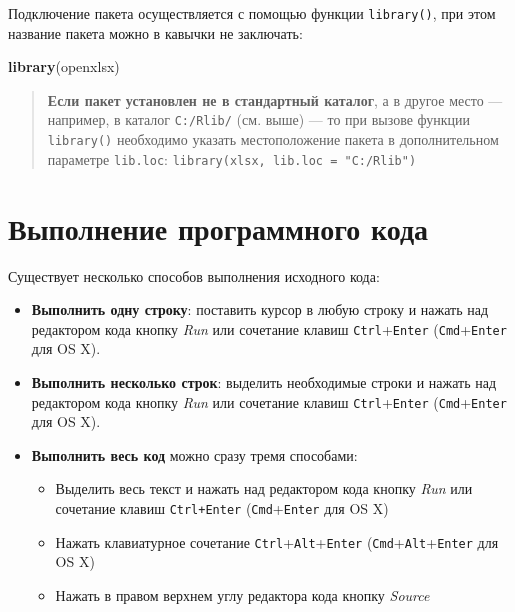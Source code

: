 \documentclass[]{book}
\newenvironment{Shaded}{\begin{snugshade}}{\end{snugshade}}
\newcommand{\KeywordTok}[1]{\textcolor[rgb]{0.13,0.29,0.53}{\textbf{#1}}}
\newcommand{\NormalTok}[1]{#1}
\providecommand{\tightlist}{%
  \setlength{\itemsep}{0pt}\setlength{\parskip}{0pt}}
\begin{document}
Подключение пакета осуществляется с помощью функции \texttt{library()},
при этом название пакета можно в кавычки не заключать:

\begin{Shaded}
\begin{Highlighting}[]
\KeywordTok{library}\NormalTok{(openxlsx)}
\end{Highlighting}
\end{Shaded}

\begin{quote}
\textbf{Если пакет установлен не в стандартный каталог}, а в другое
место --- например, в каталог \texttt{С:/Rlib/} (см. выше) --- то при
вызове функции \texttt{library()} необходимо указать местоположение
пакета в дополнительном параметре \texttt{lib.loc}:
\texttt{library(xlsx,\ lib.loc\ =\ "C:/Rlib")}
\end{quote}

\section*{Выполнение программного кода}\label{--}

Существует несколько способов выполнения исходного кода:

\begin{itemize}
\tightlist
\item
  \textbf{Выполнить одну строку}: поставить курсор в любую строку и
  нажать над редактором кода кнопку \emph{Run} или сочетание клавиш
  \texttt{Ctrl}+\texttt{Enter} (\texttt{Cmd}+\texttt{Enter} для OS X).
\item
  \textbf{Выполнить несколько строк}: выделить необходимые строки и
  нажать над редактором кода кнопку \emph{Run} или сочетание клавиш
  \texttt{Ctrl}+\texttt{Enter} (\texttt{Cmd}+\texttt{Enter} для OS X).
\item
  \textbf{Выполнить весь код} можно сразу тремя способами:

  \begin{itemize}
  \tightlist
  \item
    Выделить весь текст и нажать над редактором кода кнопку \emph{Run}
    или сочетание клавиш \texttt{Ctrl+Enter}
    (\texttt{Cmd}+\texttt{Enter} для OS X)
  \item
    Нажать клавиатурное сочетание
    \texttt{Ctrl}+\texttt{Alt}+\texttt{Enter}
    (\texttt{Cmd}+\texttt{Alt}+\texttt{Enter} для OS X)
  \item
    Нажать в правом верхнем углу редактора кода кнопку \emph{Source}
  \end{itemize}
\end{itemize}
\end{document}
